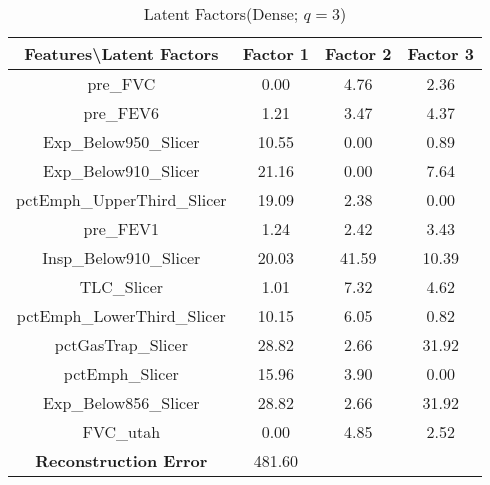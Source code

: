 \documentclass[11pt]{article}
\begin{document}
\begin{table}[ht]
\caption{Latent Factors(Dense; $q=3$)}
\centering
\begin{tabular}{c | c | c | c}
\hline\hline
Features\textbackslash Latent Factors & Factor 1 & Factor 2 & Factor 3\\[1ex]
\hline
pre\_FVC  &  0.00  &  4.76  &  2.36 \\
pre\_FEV6  &  1.21  &  3.47  &  4.37 \\
Exp\_Below950\_Slicer  &  10.55  &  0.00  &  0.89 \\
Exp\_Below910\_Slicer  &  21.16  &  0.00  &  7.64 \\
pctEmph\_UpperThird\_Slicer  &  19.09  &  2.38  &  0.00 \\
pre\_FEV1  &  1.24  &  2.42  &  3.43 \\
Insp\_Below910\_Slicer  &  20.03  &  41.59  &  10.39 \\
TLC\_Slicer  &  1.01  &  7.32  &  4.62 \\
pctEmph\_LowerThird\_Slicer  &  10.15  &  6.05  &  0.82 \\
pctGasTrap\_Slicer  &  28.82  &  2.66  &  31.92 \\
pctEmph\_Slicer  &  15.96  &  3.90  &  0.00 \\
Exp\_Below856\_Slicer  &  28.82  &  2.66  &  31.92 \\
FVC\_utah  &  0.00  &  4.85  &  2.52 \\
\hline
\textbf{Reconstruction Error} & 481.60\\
\hline
\end{tabular}
\end{table}
\end{document}
